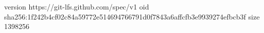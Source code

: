 version https://git-lfs.github.com/spec/v1
oid sha256:1f242b4cf02c84a59772e514694766791d0f7843a6affcfb3e9939274efbcb3f
size 1398256
